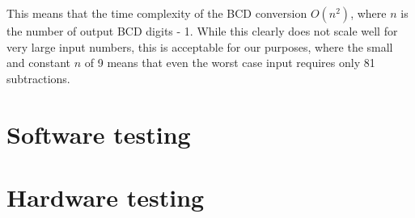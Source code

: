 \documentclass[12pt,a4paper]{article}
\begin{document}
This means that the time complexity of the BCD conversion $O(n^2)$,
where $n$ is the number of output BCD digits - 1. While this clearly
does not scale well for very large input numbers, this is acceptable
for our purposes, where the small and constant $n$ of 9 means that
even the worst case input requires only 81 subtractions.

\section{Software testing}

\section{Hardware testing}
\end{document}
